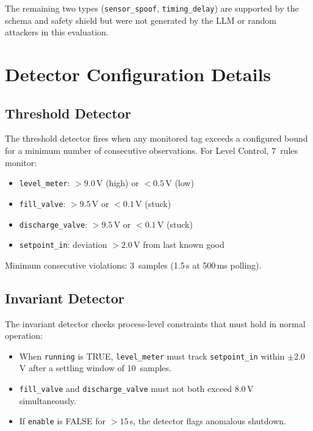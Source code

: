 \noindent The remaining two types (\texttt{sensor\_spoof}, \texttt{timing\_delay}) are supported by the schema and safety shield but were not generated by the LLM or random attackers in this evaluation.



\section{Detector Configuration Details}
\label{sec:appendix-detectors}

\subsection{Threshold Detector}
\label{subsec:appendix-threshold}

The threshold detector fires when any monitored tag exceeds a configured bound for a minimum number of consecutive observations. For Level Control, 7~rules monitor:
\begin{itemize}[leftmargin=1em,nosep]
  \item \texttt{level\_meter}: $> 9.0$\,V (high) or $< 0.5$\,V (low)
  \item \texttt{fill\_valve}: $> 9.5$\,V or $< 0.1$\,V (stuck)
  \item \texttt{discharge\_valve}: $> 9.5$\,V or $< 0.1$\,V (stuck)
  \item \texttt{setpoint\_in}: deviation $> 2.0$\,V from last known good
\end{itemize}
Minimum consecutive violations: 3~samples (1.5\,s at 500\,ms polling).

\subsection{Invariant Detector}
\label{subsec:appendix-invariant}

The invariant detector checks process-level constraints that must hold in normal operation:
\begin{itemize}[leftmargin=1em,nosep]
  \item When \texttt{running} is TRUE, \texttt{level\_meter} must track \texttt{setpoint\_in} within $\pm 2.0$\,V after a settling window of 10~samples.
  \item \texttt{fill\_valve} and \texttt{discharge\_valve} must not both exceed $8.0$\,V simultaneously.
  \item If \texttt{enable} is FALSE for $> 15$\,s, the detector flags anomalous shutdown.
\end{itemize}

